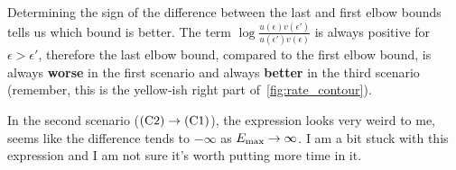 \documentclass[pra,
aps,
twocolumn,
superscriptaddress,
groupedaddress,
nofootinbib,
reprint
]{revtex4-1}
\begin{document}
Determining the sign of the difference between the last and first elbow bounds tells us which bound is better.
The term $\log{\frac{u(\epsilon)v(\epsilon')}{u(\epsilon')v(\epsilon)}}$ is always positive for $\epsilon > \epsilon'$, therefore the last elbow bound, compared to the first elbow bound, is always \textbf{worse} in the first scenario and always \textbf{better} in the third scenario (remember, this is the yellow-ish right part of~\cref{fig:rate_contour}).

In the second scenario ($\rm{(C2)} \rightarrow \rm{(C1)}$), the expression looks very weird to me, seems like the difference tends to $-\infty$ as $E_{\rm{max}} \rightarrow \infty$.
I am a bit stuck with this expression and I am not sure it's worth putting more time in it.
\end{document}
